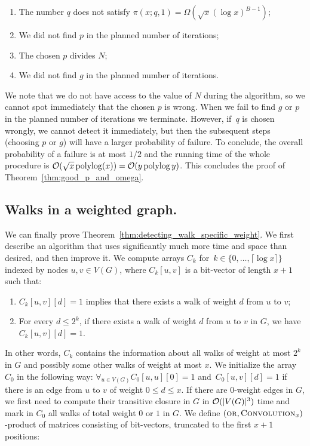\begin{enumerate}
 \item The number $q$ does not satisfy $\pi(x;q,1) = \Omega(\sqrt{x}(\log x)^{B-1})$;
 \item We did not find $p$ in the planned number of iterations;
 \item The chosen $p$ divides $N$; 
 \item We did not find $g$ in the planned number of iterations.
\end{enumerate}
We note that we do not have access to the value of $N$ during the algorithm, so we cannot spot immediately that the chosen $p$ is wrong.
When we fail to find $g$ or $p$ in the planned number of iterations we terminate.
However,  if~$q$ is chosen wrongly, we cannot detect it immediately, but then the subsequent steps (choosing $p$ or $g$) will have a larger probability of failure.
To conclude, the overall probability of a failure is at most $1/2$ and the running time of the whole procedure is $\mathcal{O}(\sqrt x\operatorname{polylog}(x))=\mathcal{O}(y\operatorname{polylog} y)$.
This concludes the proof of Theorem~\ref{thm:good_p_and_omega}.



\subsection{Walks in a weighted graph.} 
We can finally prove Theorem~\ref{thm:detecting_walk_specific_weight}. We first describe an algorithm that uses significantly much more time and space than desired, and then improve it.
 We compute arrays $C_k$ for~$k\in \{0,\ldots, \lceil \log x \rceil\}$ indexed by nodes $u,v\in V(G)$, where $C_k[u,v]$ is a bit-vector of length $x+1$ such that:
 \begin{enumerate}
  \item $C_k[u,v][d]=1$ implies that there exists a walk of weight $d$ from $u$ to $v$;
  \item For every $d\leq 2^k$, if there exists a walk of weight $d$ from $u$ to $v$ in $G$, we have $C_k[u,v][d]=1$.
 \end{enumerate}
In other words, $C_k$ contains the information about all walks of weight at most $2^k$ in $G$ and possibly some other walks of weight at most $x$.
We initialize the array $C_0$ in the following way: $\forall_{u\in V(G)} C_0[u,u][0]=1$ and~$C_0[u,v][d]=1$ if there is an edge from $u$ to $v$ of weight $0 \le d \le x$.
If there are 0-weight edges in $G$, we first need to compute their transitive closure in $G$ in $\mathcal{O}(|V(G)|^3)$ time and mark in $C_0$ all walks of total weight $0$ or $1$ in $G$.
We define $(\textsc{or},\textsc{Convolution}_x)$-product of matrices consisting of bit-vectors, truncated to the first $x+1$ positions:

